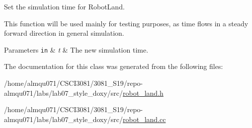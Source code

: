 Set the simulation time for Robot\+Land. 

This function will be used mainly for testing purposes, as time flows in a steady forward direction in general simulation.


\begin{DoxyParams}[1]{Parameters}
\mbox{\tt in}  & {\em t} & The new simulation time. \\
\hline
\end{DoxyParams}


The documentation for this class was generated from the following files\+:\begin{DoxyCompactItemize}
\item 
/home/almqu071/\+C\+S\+C\+I3081/3081\+\_\+\+S19/repo-\/almqu071/labs/lab07\+\_\+style\+\_\+doxy/src/\hyperlink{robot__land_8h}{robot\+\_\+land.\+h}\item 
/home/almqu071/\+C\+S\+C\+I3081/3081\+\_\+\+S19/repo-\/almqu071/labs/lab07\+\_\+style\+\_\+doxy/src/\hyperlink{robot__land_8cc}{robot\+\_\+land.\+cc}\end{DoxyCompactItemize}
